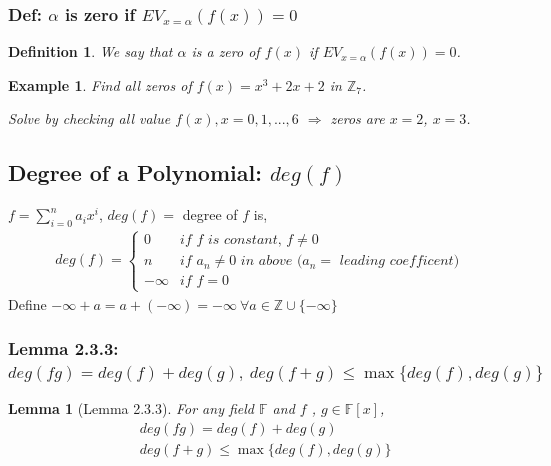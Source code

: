 \documentclass[11pt,a4paper]{article}
\newtheorem{lemma}{Lemma}
\newtheorem{example}{Example}
\newtheorem{definition}{Definition}
\begin{document}
\subsubsection{Def: $\alpha$ is zero if $EV_{x=\alpha}(f(x))=0$}
\begin{definition}
    We say that $\alpha$ is a zero of $f(x)$ if $EV_{x=\alpha}(f(x))=0$.
\end{definition}
\begin{example}
    Find all zeros of $f(x)=x^3+2x+2$ in $\mathbb{Z}_7$.

    Solve by checking all value $f(x),x=0,1,...,6$ $\Rightarrow$ zeros are $x=2$, $x=3$.
\end{example}




\subsection{Degree of a Polynomial: $deg(f)$}
$f=\sum_{i=0}^na_ix^i$, $deg(f)=$ degree of $f$ is,
\begin{equation}
    \begin{aligned}
        deg(f)=\left\{\begin{matrix}
            0& \textit{if $f$ is constant, $f\neq0$}\\
            n& \textit{if $a_n\neq0$ in above ($a_n=$ leading coefficent)}\\
            -\infty& \textit{if } f=0
        \end{matrix}\right.
    \end{aligned}
    \nonumber
\end{equation}
Define $-\infty+ a = a + (-\infty) = -\infty\ \forall a \in \mathbb{Z} \cup \{-\infty\}$
\subsubsection{Lemma 2.3.3: $deg(fg)=deg(f)+deg(g)
,\ deg(f+g)\leq\max\{deg(f),deg(g)\}$}
\begin{lemma}[Lemma 2.3.3]
    For any field $\mathbb{F}$ and $f$ , $g \in \mathbb{F}[x]$,
    \begin{equation}
        \begin{aligned}
            &deg(fg)=deg(f)+deg(g)\\
            &deg(f+g)\leq\max\{deg(f),deg(g)\}
        \end{aligned}
        \nonumber
    \end{equation}
\end{lemma}
\end{document}

